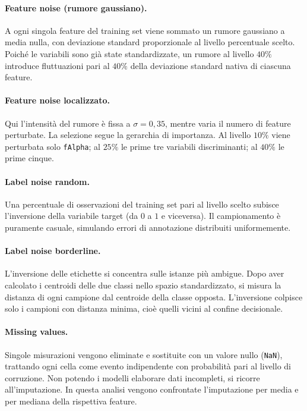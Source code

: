 \documentclass[12pt,a4paper]{article}
\begin{document}
\paragraph{Feature noise (rumore gaussiano).} A ogni singola feature del
training set viene sommato un rumore gaussiano a media nulla, con deviazione
standard proporzionale al livello percentuale scelto. Poiché le variabili sono
già state standardizzate, un rumore al livello $40\%$ introduce fluttuazioni
pari al $40\%$ della deviazione standard nativa di ciascuna feature.

\paragraph{Feature noise localizzato.} Qui l'intensità del rumore è fissa a
$\sigma = 0{,}35$, mentre varia il numero di feature perturbate. La selezione
segue la gerarchia di importanza. Al livello $10\%$ viene perturbata solo
\texttt{fAlpha}; al $25\%$ le prime tre variabili discriminanti; al $40\%$ le
prime cinque.

\paragraph{Label noise random.} Una percentuale di osservazioni del training set
pari al livello scelto subisce l'inversione della variabile target (da $0$ a $1$
e viceversa). Il campionamento è puramente casuale, simulando errori di
annotazione distribuiti uniformemente.

\paragraph{Label noise borderline.} L'inversione delle etichette si concentra
sulle istanze più ambigue. Dopo aver calcolato i centroidi delle due classi
nello spazio standardizzato, si misura la distanza di ogni campione dal
centroide della classe opposta. L'inversione colpisce solo i campioni con
distanza minima, cioè quelli vicini al confine decisionale.

\paragraph{Missing values.} Singole misurazioni vengono eliminate e sostituite
con un valore nullo (\texttt{NaN}), trattando ogni cella come evento
indipendente con probabilità pari al livello di corruzione. Non potendo i
modelli elaborare dati incompleti, si ricorre all'imputazione. In questa analisi
vengono confrontate l'imputazione per media e per mediana della rispettiva
feature.
\end{document}
